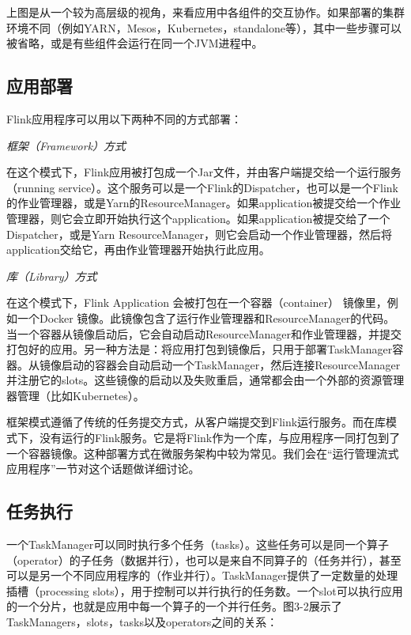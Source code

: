 \documentclass[cn,11pt,chinese]{elegantbook}
\renewenvironment{quote}{\begin{customblockquote}\list{}{\rightmargin=0em\leftmargin=0em}%
\item\relax\color{blockquote-text}\ignorespaces}{\unskip\unskip\endlist\end{customblockquote}}
\begin{document}
\begin{quote}
上图是从一个较为高层级的视角，来看应用中各组件的交互协作。如果部署的集群环境不同（例如YARN，Mesos，Kubernetes，standalone等），其中一些步骤可以被省略，或是有些组件会运行在同一个JVM进程中。
\end{quote}

\hypertarget{ux5e94ux7528ux90e8ux7f72}{%
\subsection{应用部署}\label{ux5e94ux7528ux90e8ux7f72}}

Flink应用程序可以用以下两种不同的方式部署：

\emph{框架（Framework）方式}

在这个模式下，Flink应用被打包成一个Jar文件，并由客户端提交给一个运行服务（running
service）。这个服务可以是一个Flink的Dispatcher，也可以是一个Flink的作业管理器，或是Yarn的ResourceManager。如果application被提交给一个作业管理器，则它会立即开始执行这个application。如果application被提交给了一个Dispatcher，或是Yarn
ResourceManager，则它会启动一个作业管理器，然后将application交给它，再由作业管理器开始执行此应用。

\emph{库（Library）方式}

在这个模式下，Flink Application 会被打包在一个容器（container）
镜像里，例如一个Docker
镜像。此镜像包含了运行作业管理器和ResourceManager的代码。当一个容器从镜像启动后，它会自动启动ResourceManager和作业管理器，并提交打包好的应用。另一种方法是：将应用打包到镜像后，只用于部署TaskManager容器。从镜像启动的容器会自动启动一个TaskManager，然后连接ResourceManager并注册它的slots。这些镜像的启动以及失败重启，通常都会由一个外部的资源管理器管理（比如Kubernetes）。

框架模式遵循了传统的任务提交方式，从客户端提交到Flink运行服务。而在库模式下，没有运行的Flink服务。它是将Flink作为一个库，与应用程序一同打包到了一个容器镜像。这种部署方式在微服务架构中较为常见。我们会在``运行管理流式应用程序''一节对这个话题做详细讨论。

\hypertarget{ux4efbux52a1ux6267ux884c}{%
\subsection{任务执行}\label{ux4efbux52a1ux6267ux884c}}

一个TaskManager可以同时执行多个任务（tasks）。这些任务可以是同一个算子（operator）的子任务（数据并行），也可以是来自不同算子的（任务并行），甚至可以是另一个不同应用程序的（作业并行）。TaskManager提供了一定数量的处理插槽（processing
slots），用于控制可以并行执行的任务数。一个slot可以执行应用的一个分片，也就是应用中每一个算子的一个并行任务。图3-2展示了TaskManagers，slots，tasks以及operators之间的关系：
\end{document}

